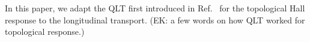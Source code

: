 \documentclass[amsmath,amssymb, aps, prl, twocolumn]{revtex4-1}
\begin{document}
In this paper, we adapt the QLT first introduced in Ref.~\cite{qlt2016} for the topological Hall response to the longitudinal transport.  {\color{red}(EK: a few words on how QLT worked for topological response.)}
\end{document}
